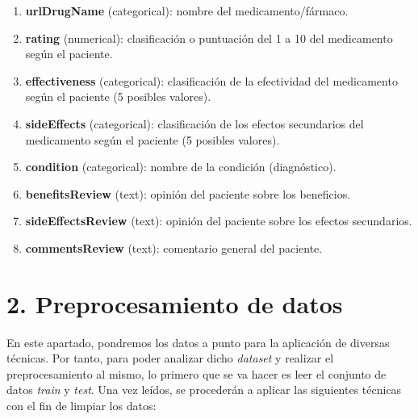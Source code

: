 \documentclass[spanish,]{article}
\providecommand{\tightlist}{%
  \setlength{\itemsep}{0pt}\setlength{\parskip}{0pt}}
\begin{document}
\begin{enumerate}
\def\labelenumi{\arabic{enumi}.}
\tightlist
\item
  \textbf{urlDrugName} (categorical): nombre del medicamento/fármaco.
\item
  \textbf{rating} (numerical): clasificación o puntuación del 1 a 10 del
  medicamento según el paciente.
\item
  \textbf{effectiveness} (categorical): clasificación de la efectividad
  del medicamento según el paciente (5 posibles valores).
\item
  \textbf{sideEffects} (categorical): clasificación de los efectos
  secundarios del medicamento según el paciente (5 posibles valores).
\item
  \textbf{condition} (categorical): nombre de la condición
  (diagnóstico).
\item
  \textbf{benefitsReview} (text): opinión del paciente sobre los
  beneficios.
\item
  \textbf{sideEffectsReview} (text): opinión del paciente sobre los
  efectos secundarios.
\item
  \textbf{commentsReview} (text): comentario general del paciente.
\end{enumerate}

\section{2. Preprocesamiento de datos}\label{preprocesamiento-de-datos}

En este apartado, pondremos los datos a punto para la aplicación de
diversas técnicas. Por tanto, para poder analizar dicho \emph{dataset} y
realizar el preprocesamiento al mismo, lo primero que se va hacer es
leer el conjunto de datos \emph{train} y \emph{test}. Una vez leídos, se
procederán a aplicar las siguientes técnicas con el fin de limpiar los
datos:
\end{document}
